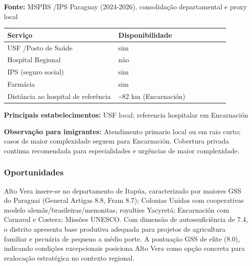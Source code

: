 \textbf{Fonte:} MSPBS /\allowbreak  IPS Paraguay (2024-2026), consolidação
departamental e proxy local

{\def\LTcaptype{none} %
\begin{longtable}{@{}>{\raggedright\arraybackslash}p{0.45\linewidth} >{\raggedright\arraybackslash}p{0.45\linewidth}@{}}
\toprule\noalign{}
Serviço & Disponibilidade \\
\midrule\noalign{}
\endhead
\bottomrule\noalign{}
\endlastfoot
USF /\allowbreak  Posto de Saúde & sim \\
Hospital Regional & não \\
IPS (seguro social) & sim \\
Farmácia & sim \\
Distância ao hospital de referência & \textasciitilde82 km
(Encarnación) \\
\end{longtable}
}

\textbf{Principais estabelecimentos:} USF local; referencia hospitalar
em Encarnación

\textbf{Observação para imigrantes:} Atendimento primario local ou em
raio curto; casos de maior complexidade seguem para Encarnación.
Cobertura privada continua recomendada para especialidades e urgências
de maior complexidade.
\newpage

\subsubsection*{Oportunidades}\label{oport-alto-vera-0725}
Alto Vera insere-se no departamento de Itapúa, caracterizado por maiores GSS do Paraguai (General Artigas 8.8, Fram 8.7); Colonias Unidas com cooperativas modelo alemãs/brasileiras/menonitas; royalties Yacyretá; Encarnación com Carnaval e Costera; Missões UNESCO. Com dimensão de autossuficiência de 7.4, o distrito apresenta base produtiva adequada para projetos de agricultura familiar e pecuária de pequeno a médio porte. A pontuação GSS de elite (8.0), indicando condições excepcionais posiciona Alto Vera como opção concreta para realocação estratégica no contexto regional.

